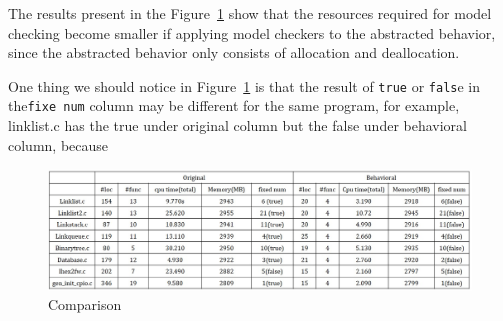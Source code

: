The results present in the Figure~\ref{fig:statistic} show that the
resources required for model checking become smaller if applying model
checkers to the abstracted behavior, since the abstracted behavior
only consists of allocation and deallocation.

One thing we should notice in Figure~\ref{fig:statistic} is that
the
result of \texttt{true} or \texttt{fals}e in the\texttt{fixe num} column may
be different for the same program, for example, linklist.c has the
true under original column but the false under behavioral column,
because

\begin{figure}
 \centering
 \includegraphics[width=14cm]{statistic.png}
\caption{Comparison}
\label{fig:statistic}
\end{figure}
